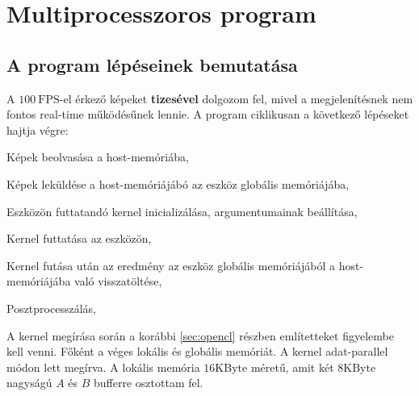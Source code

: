 \chapter{Multiprocesszoros program}
\section{A program lépéseinek bemutatása}
	A $100\ \mathrm{FPS}$-el érkező képeket \textbf{tizesével} dolgozom fel, mivel a megjelenítésnek
	nem fontos real-time működésűnek lennie. 
	A program ciklikusan a következő lépéseket hajtja végre:
	\begin{enumerate*}
		\item Képek beolvasása a host-memóriába,
		\item Képek leküldése a host-memóriájábó az eszköz globális memóriájába,
		\item Eszközön futtatandó kernel inicializálása, argumentumainak beállítása,
		\item Kernel futtatása az eszközön,
		\item Kernel futása után az eredmény az eszköz globális memóriájából a host-memóriájába való
		visszatöltése,
		\item Posztprocesszálás,
	\end{enumerate*}
	A kernel megírása során a korábbi \ref{sec:opencl} részben említetteket figyelembe kell venni.
	Főként a véges lokális és globális memóriát. A kernel adat-parallel módon lett megírva.
	A lokális memória $16 \mathrm{KByte}$ méretű, amit két $8 \mathrm{KByte}$ nagyságú $A$ és $B$
	bufferre osztottam fel.
	
